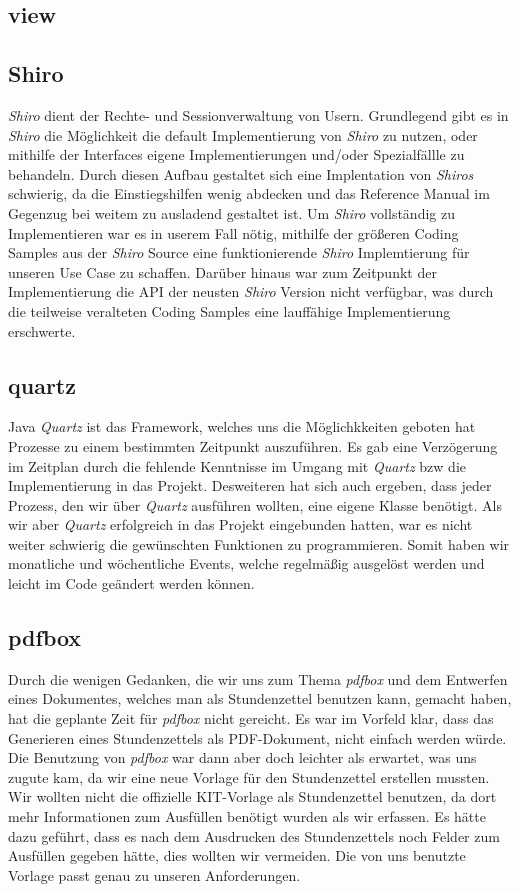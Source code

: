 \subsection{view} %

\subsection{Shiro}
\emph{Shiro} dient der Rechte- und Sessionverwaltung von Usern.
Grundlegend gibt es in \emph{Shiro} die Möglichkeit die default Implementierung von \emph{Shiro} zu nutzen, oder mithilfe der Interfaces
eigene Implementierungen und/oder Spezialfällle zu behandeln.
Durch diesen Aufbau gestaltet sich eine Implentation von \emph{Shiros} schwierig, da die Einstiegshilfen wenig abdecken und das Reference Manual
im Gegenzug bei weitem zu ausladend gestaltet ist. Um \emph{Shiro} vollständig zu Implementieren war es in userem Fall nötig, mithilfe der
größeren Coding Samples aus der \emph{Shiro} Source eine funktionierende \emph{Shiro} Implemtierung für unseren Use Case zu schaffen.
Darüber hinaus war zum Zeitpunkt der Implementierung die API der neusten \emph{Shiro} Version nicht verfügbar, was durch die teilweise veralteten Coding Samples
 eine lauffähige Implementierung erschwerte.
 
\subsection{quartz} 
Java \emph{Quartz} ist das Framework, welches uns die Möglichkkeiten geboten hat Prozesse zu einem bestimmten Zeitpunkt auszuführen. Es gab eine Verzögerung im Zeitplan durch die fehlende Kenntnisse im Umgang mit \emph{Quartz} bzw die Implementierung in das Projekt.
Desweiteren hat sich auch ergeben, dass jeder Prozess, den wir über \emph{Quartz} ausführen wollten, eine eigene Klasse benötigt. Als wir aber \emph{Quartz} erfolgreich in das Projekt eingebunden hatten, war es nicht weiter schwierig die gewünschten Funktionen zu programmieren. Somit haben wir monatliche und wöchentliche Events, welche regelmäßig ausgelöst werden und leicht im Code geändert werden können.

\subsection{pdfbox}
Durch die wenigen Gedanken, die wir uns zum Thema \emph{pdfbox} und dem Entwerfen eines Dokumentes, welches man als Stundenzettel benutzen kann, gemacht haben, hat die geplante Zeit für \emph{pdfbox} nicht gereicht. Es war im Vorfeld klar, dass das Generieren eines Stundenzettels als PDF-Dokument, nicht einfach werden würde.
Die Benutzung von \emph{pdfbox} war dann aber doch leichter als erwartet, was uns zugute kam, da wir eine neue Vorlage für den Stundenzettel erstellen mussten. Wir wollten nicht die offizielle KIT-Vorlage als Stundenzettel benutzen, da dort mehr Informationen zum Ausfüllen benötigt wurden als wir erfassen. Es hätte dazu geführt, dass es nach dem Ausdrucken des Stundenzettels noch Felder zum Ausfüllen gegeben hätte, dies wollten wir vermeiden. Die von uns benutzte Vorlage passt genau zu unseren Anforderungen.

